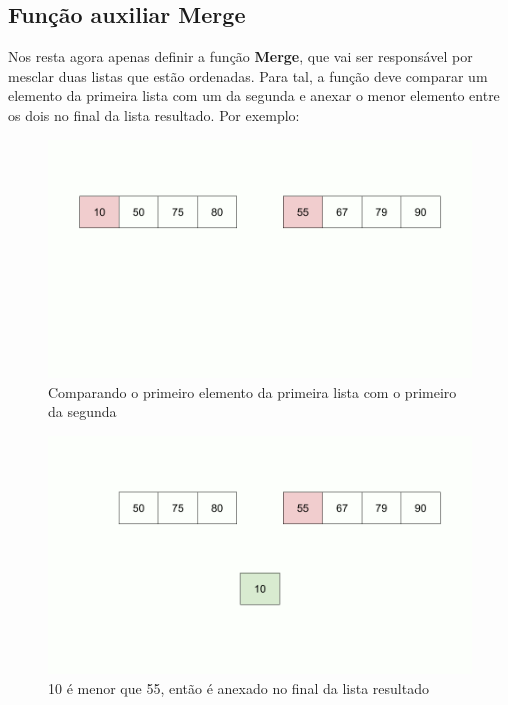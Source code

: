 \subsection{Função auxiliar Merge}

\noindent
Nos resta agora apenas definir a função \textbf{Merge}, que vai ser responsável por mesclar duas listas que estão ordenadas. Para tal, a função deve comparar um elemento da primeira lista com um da segunda e anexar o menor elemento entre os dois no final da lista resultado. Por exemplo:

\begin{figure}[!ht]
	\centering
	\includegraphics[scale=0.3]{figures/merge/merge-function-1.png}
	\caption{Comparando o primeiro elemento da primeira lista com o primeiro da segunda}
\end{figure}
\begin{figure}[!ht]
	\centering
	\includegraphics[scale=0.3]{figures/merge/merge-function-3.png}
	\caption{10 é menor que 55, então é anexado no final da lista resultado}
\end{figure}
